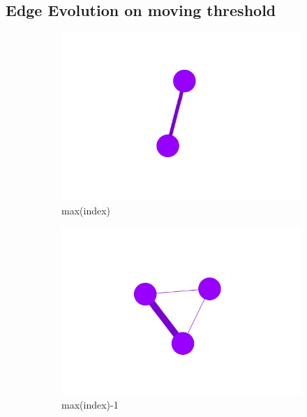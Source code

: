 \subsection{Edge Evolution on moving threshold}
\label{suppl:relations}
\begin{figure}[!htb]
	\centering
	\begin{subfigure}[b]{0.15\linewidth}
		\includegraphics[width=\linewidth]{Minor Thesis/figures/graphs/nn/A.png}
		\caption{max(index)}
	\end{subfigure}
	\hfill
	\begin{subfigure}[b]{0.15\linewidth}
		\includegraphics[width=\linewidth]{Minor Thesis/figures/graphs/nn/B.png}
		\caption{max(index)-1}
	\end{subfigure}
	\hfill
	\begin{subfigure}[b]{0.15\linewidth}

\end{subfigure}
\end{figure}
